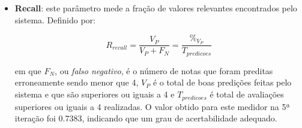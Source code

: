 \begin{itemize}
  \item \textbf{Recall}: este parâmetro mede a fração de valores relevantes
  encontrados pelo sistema. Definido por:
 
  \begin{equation}
  R_{recall} = \frac{V_P}{V_P + F_N}  = \frac{\%_{V_P}}{T_{predicoes}}
  \end{equation}
 
  em que \(F_N\), ou \textit{falso negativo}, é o número de notas que foram
  preditas erroneamente sendo menor que 4,  \(V_P\) é o total de boas predições
  feitas pelo sistema e que são superiores ou iguais a 4 e \(T_{predicoes}\) é
  total de avaliações superiores ou iguais a 4 realizadas.  O valor obtido para
  este medidor na 5ª iteração foi 0.7383, indicando que um grau de
  acertabilidade adequado.
 
\end{itemize}